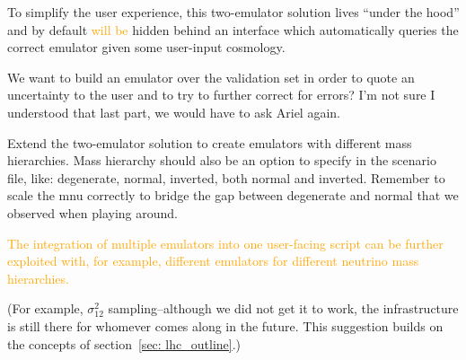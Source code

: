 To simplify the user experience, this two-emulator solution lives ``under the
hood'' and by default \textcolor{orange}{will be} hidden behind an interface
which automatically queries the correct emulator given some user-input
cosmology.

We want to build an emulator over the validation set in order to quote an 
uncertainty to the user and to try to further correct for errors? I'm not sure 
I understood that last part, we would have to ask Ariel again.

Extend the two-emulator solution to create emulators with different mass
hierarchies. Mass hierarchy should also be an option to specify in the
scenario file, like: degenerate, normal, inverted, both normal and inverted. 
Remember to scale the mnu correctly to bridge the gap between degenerate and
normal that we observed when playing around.

\textcolor{orange}{The integration of 
multiple emulators into one user-facing script can be further exploited with, 
for example, different emulators for different neutrino mass hierarchies.}

(For example, $\sigma_{12}^2$ sampling--although we did not
get it to work, the infrastructure is still there for whomever comes along in
the future. This suggestion builds on the concepts of
section~\ref{sec: lhc_outline}.)

